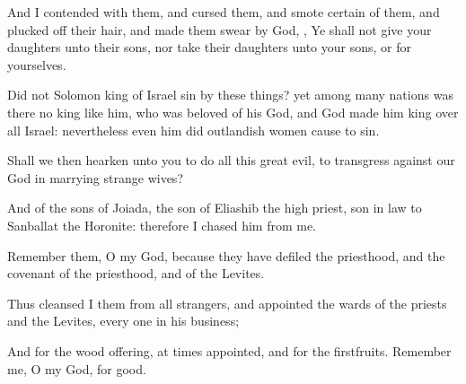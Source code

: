 {And I
contended with them, and
cursed them, and
smote
certain of them, and plucked off their
hair, and made them
swear by
God,
{}, Ye shall not
give your
daughters unto their
sons, nor
take their
daughters unto your
sons, or for yourselves.

Did not
Solomon
king of
Israel
sin by these things? yet among
many
nations was there no
king like him, who was
beloved of his
God, and
God
made him
king over all
Israel: nevertheless even
him did
outlandish
women cause to
sin.

Shall we then
hearken unto you to
do all this
great
evil, to
transgress against our
God in
marrying
strange
wives?

And
{} of the
sons of
Joiada, the
son of
Eliashib the
high
priest,
{} son in
law to
Sanballat the
Horonite: therefore I
chased him from me.

Remember them, O my
God, because they have
defiled the
priesthood, and the
covenant of the
priesthood, and of the
Levites.

Thus
cleansed I them from all
strangers, and
appointed the
wards of the
priests and the
Levites, every
one in his
business;

And for the
wood
offering, at
times
appointed, and for the
firstfruits.
Remember me, O my
God, for
good.


\par }